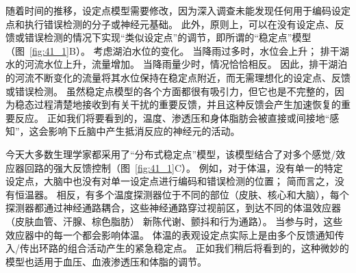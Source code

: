 随着时间的推移，设定点模型需要修改，因为深入调查未能发现任何用于编码设定点和执行错误检测的分子或神经元基础。
此外，原则上，可以在没有设定点、反馈或错误检测的情况下实现“类似设定点”的调节，即所谓的“稳定点”模型（图~\ref{fig:41_1}B）。
考虑湖泊水位的变化。
当降雨过多时，水位会上升；
排干湖水的河流水位上升，流量增加。
当降雨量少时，情况恰恰相反。
因此，排干湖泊的河流不断变化的流量将其水位保持在稳定点附近，而无需理想化的设定点、反馈或错误检测。
虽然稳定点模型的各个方面都很有吸引力，但它也是不完整的，因为稳态过程清楚地接收到有关干扰的重要反馈，并且这种反馈会产生加速恢复的重要反应。
正如我们将要看到的，温度、渗透压和身体脂肪会被直接或间接地“感知”，这会影响下丘脑中产生抵消反应的神经元的活动。


今天大多数生理学家都采用了“分布式稳定点”模型，该模型结合了对多个感觉/效应器回路的强大反馈控制（图~\ref{fig:41_1}C）。
例如，对于体温，没有单一的特定设定点，大脑中也没有对单一设定点进行编码和错误检测的位置；
简而言之，没有恒温器。
相反，有多个温度探测器位于不同的部位（皮肤、核心和大脑），每个探测器都通过神经通路耦合，这些神经通路穿过视前区，到达不同的体温效应器（皮肤血管、汗腺、棕色脂肪） 新陈代谢、颤抖和行为通路）。
当参与时，这些效应器中的每一个都会影响体温。
体温的表观设定点实际上是由多个反馈通知传入/传出环路的组合活动产生的紧急稳定点。
正如我们稍后将看到的，这种微妙的模型也适用于血压、血液渗透压和体脂的调节。


